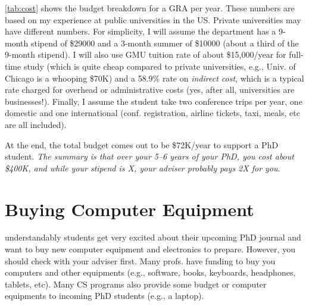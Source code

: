 \documentclass[oneside,11pt,dvipsnames]{book}
\newcommand{\mycomment}[3][\color{blue}]{{#1{{#2}: {#3}}}}
\newcommand{\tvn}[1]{\mycomment{TVN}{#1}}{}
\begin{document}
\autoref{tab:cost} shows the budget breakdown for a GRA per year.
These numbers are based on my experience at public universities in the US. Private universities may have different numbers.  For simplicity, I will assume the department has a 9-month stipend of \$29000 and a 3-month summer of \$10000 (about a third of the 9-month stipend). I will also use GMU tuition rate of about \$15,000/year for full-time study (which is quite cheap compared to private universities, e.g., Univ. of Chicago is a whooping \$70K) and a 58.9\% rate on \emph{indirect cost}, which is a typical rate charged for overhead or administrative costs (yes, after all, universities are businesses!).  Finally, I assume the student take two conference trips per year, one domestic and one international (conf. registration, airline tickets, taxi, meals, etc are all included).

At the end, the total budget comes out to be \$72K/year to support a PhD student. \emph{The summary is that over your 5--6 years of your PhD, you cost about \$400K, and while your stipend is X, your adviser probably pays 2X for you}.




\section{Buying Computer Equipment}\label{sec:buying-equipment} understandably students get very excited about their upcoming PhD journal and want to buy new computer equipment and electronics to prepare. However, you should check with your adviser first.  Many profs. have funding to buy you computers and other equipments (e.g., software, books, keyboards, headphones, tablets, etc). Many CS programs also provide some budget or computer equipments to incoming PhD students (e.g., a laptop).
\end{document}
